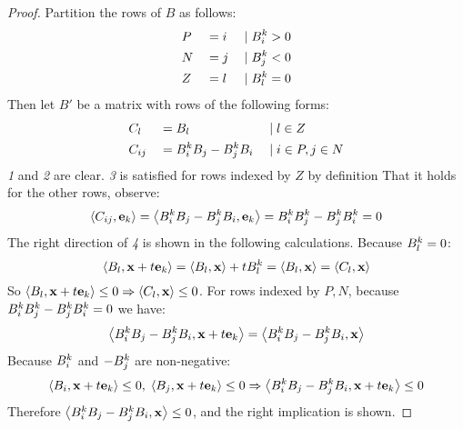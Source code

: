 \begin{proof}
	Partition the rows of $B$ as follows:
	\begin{alignat*}{3}
		 & P &  & = i & \;|\; & B^k_i > 0 \\
		 & N &  & = j & \;|\; & B^k_j < 0 \\
		 & Z &  & = l & \;|\; & B^k_l = 0
	\end{alignat*}
	Then let $B'$ be a matrix with rows of the following forms:
	\begin{alignat*}{3}
		 & C_l    &  & = B_l                 & \;|\; & l \in Z          \\
		 & C_{ij} &  & = B^k_i B_j - B^k_j B_i & \;|\; & i \in P, j \in N
	\end{alignat*}
	\textit{1} and \textit{2} are clear.  \textit{3} is satisfied for rows indexed by $Z$ by definition  That it holds for the other rows, observe:
   \[\left\langle C_{ij}, \mathbf{e}_k \right\rangle = \left\langle B^k_i B_j - B^k_j B_i, \mathbf{e}_k \right\rangle = B^k_i B^k_j - B^k_j B^k_i = 0\]
	The right direction of \textit{4} is shown in the following calculations.  Because $B^k_l = 0$:
	\[ \left\langle B_l, \mathbf{x}+t\mathbf{e}_k \right\rangle = \left\langle B_l, \mathbf{x} \right\rangle + tB^k_l = \left\langle B_l, \mathbf{x} \right\rangle = \left\langle C_l, \mathbf{x} \right\rangle \]
	So $\left\langle B_l, \mathbf{x}+t\mathbf{e}_k \right\rangle \leq 0 \Rightarrow \left\langle C_l, \mathbf{x} \right\rangle \leq 0$.  For rows indexed by $P,N$, because $B^k_i B^k_j - B^k_j B^k_i = 0$ we have:
	\[ \left\langle B^k_i B_j - B^k_j B_i, \mathbf{x} + t\mathbf{e}_k \right\rangle = \left\langle B^k_i B_j - B^k_j B_i, \mathbf{x} \right\rangle \]
	Because $B^k_i$ and $-B^k_j$ are non-negative:
	\[ \left\langle B_i, \mathbf{x}+t\mathbf{e}_k \right\rangle \leq 0,\; \left\langle B_j, \mathbf{x}+t\mathbf{e}_k \right\rangle \leq 0 \Rightarrow
		\left\langle B^k_i B_j - B^k_j B_i, \mathbf{x} + t\mathbf{e}_k \right\rangle \leq 0\]
	Therefore $\left\langle B^k_i B_j - B^k_j B_i, \mathbf{x} \right\rangle \leq 0$, and the right implication is shown.


\end{proof}
